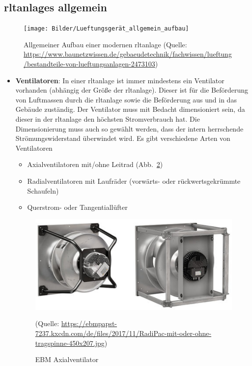 \subsection{\Acp{rltanlage} allgemein}

\begin{figure}[H]
	\centering
	\texttt{[image: Bilder/Lueftungsgerät\_allgemein\_aufbau]}
	\caption{Allgemeiner Aufbau einer modernen \ac{rltanlage} (Quelle: \url{https://www.baunetzwissen.de/gebaeudetechnik/fachwissen/lueftung/bestandteile-von-lueftungsanlagen-2473103})}
	\label{fig:Aufbau_Lueftungsgerät_allgemein}
\end{figure}

\begin{itemize}
	\item \textbf{Ventilatoren}: In einer \ac{rltanlage} ist immer mindestens ein Ventilator vorhanden (abhängig der Größe der \ac{rltanlage}). Dieser ist für die Beförderung von Luftmassen durch die \ac{rltanlage} sowie die Beförderung aus und in das Gebäude zuständig. Der Ventilator muss mit Bedacht dimensioniert sein, da dieser in der \ac{rltanlage} den höchsten Stromverbrauch hat. Die Dimensionierung muss auch so gewählt werden, dass der intern herrschende Strömungswiderstand überwindet wird. Es gibt verschiedene Arten von Ventilatoren 
\begin{itemize}
	\item Axialventilatoren mit/ohne Leitrad (Abb.~\ref{fig:EBM_Axialventilator})
	\item Radialventilatoren mit Laufräder (vorwärts- oder rückwertsgekrümmte Schaufeln)
	\item Querstrom- oder Tangentiallüfter 
\end{itemize}

\begin{figure}[H]
	\centering
	\includegraphics[width=0.5\linewidth]{Bilder/axialventilator}
	\caption{EBM Axialventilator} 
	(Quelle: \url{https://ebmpapst-7237.kxcdn.com/de/files/2017/11/RadiPac-mit-oder-ohne-tragspinne-450x207.jpg})
	\label{fig:EBM_Axialventilator}
\end{figure}


\end{itemize}
